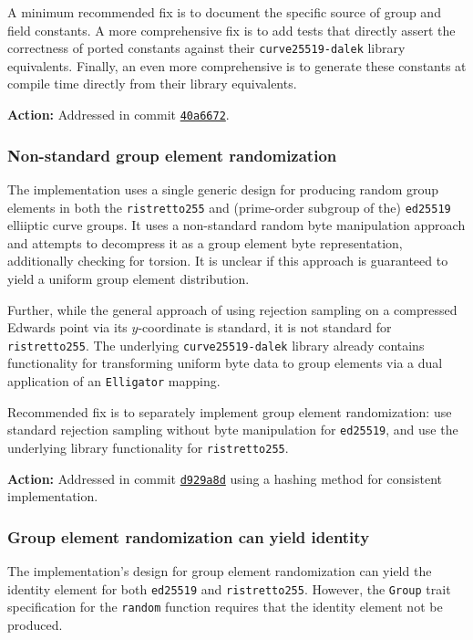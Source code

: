 \documentclass{article}
\begin{document}
A minimum recommended fix is to document the specific source of group and field constants.
A more comprehensive fix is to add tests that directly assert the correctness of ported constants against their \texttt{curve25519-dalek} library equivalents.
Finally, an even more comprehensive is to generate these constants at compile time directly from their library equivalents.

\textbf{Action:} Addressed in commit \href{https://github.com/serai-dex/serai/commit/40a6672547c371c1bc8e624bea1844aeb4dbceb8}{\texttt{40a6672}}.


\subsubsection{Non-standard group element randomization}

The implementation uses a single generic design for producing random group elements in both the \texttt{ristretto255} and (prime-order subgroup of the) \texttt{ed25519} elliiptic curve groups.
It uses a non-standard random byte manipulation approach and attempts to decompress it as a group element byte representation, additionally checking for torsion.
It is unclear if this approach is guaranteed to yield a uniform group element distribution.

Further, while the general approach of using rejection sampling on a compressed Edwards point via its $y$-coordinate is standard, it is not standard for \texttt{ristretto255}.
The underlying \texttt{curve25519-dalek} library already contains functionality for transforming uniform byte data to group elements via a dual application of an \texttt{Elligator} mapping.

Recommended fix is to separately implement group element randomization: use standard rejection sampling without byte manipulation for \texttt{ed25519}, and use the underlying library functionality for \texttt{ristretto255}.

\textbf{Action:} Addressed in commit \href{https://github.com/serai-dex/serai/commit/d929a8d96ecd066b8df88b64b9a9e8cc8bf09958}{\texttt{d929a8d}} using a hashing method for consistent implementation.


\subsubsection{Group element randomization can yield identity}

The implementation's design for group element randomization can yield the identity element for both \texttt{ed25519} and \texttt{ristretto255}.
However, the \texttt{Group} trait specification for the \texttt{random} function requires that the identity element not be produced.
\end{document}
